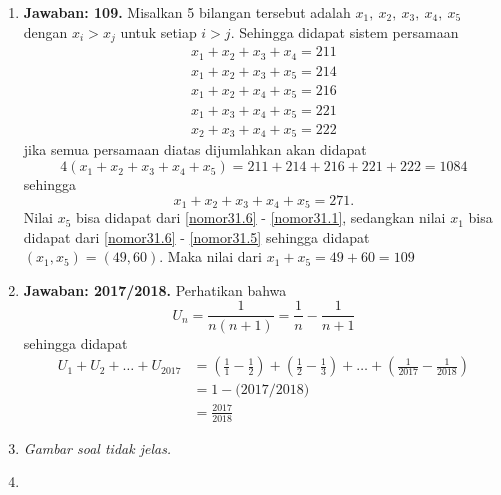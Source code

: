 \begin{enumerate}
\item \textbf{Jawaban: 109.} Misalkan 5 bilangan tersebut adalah $x_1,\ x_2,\ x_3,\ x_4,\ x_5$ dengan $x_i > x_j$ untuk setiap $i>j$. Sehingga didapat sistem persamaan
	\begin{gather}
	x_1 + x_2 + x_3 + x_4 = 211\label{nomor31.1}\\
	x_1 + x_2 + x_3 + x_5 = 214\label{nomor31.2}\\
	x_1 + x_2 + x_4 + x_5 = 216\label{nomor31.3}\\
	x_1 + x_3 + x_4 + x_5 = 221\label{nomor31.4}\\
	x_2 + x_3 + x_4 + x_5 = 222\label{nomor31.5}
	\end{gather}
jika semua persamaan diatas dijumlahkan akan didapat \[4(x_1 + x_2 + x_3 + x_4 + x_5) = 211 + 214 + 216 + 221 + 222 = 1084\]sehingga \begin{equation}\label{nomor31.6}x_1+x_2+x_3+x_4+x_5 = 271.\end{equation} Nilai $x_5$ bisa didapat dari \eqref{nomor31.6} - \eqref{nomor31.1}, sedangkan nilai $x_1$ bisa didapat dari \eqref{nomor31.6} - \eqref{nomor31.5} sehingga didapat $(x_1, x_5) = (49, 60)$. Maka nilai dari $x_1 + x_5 = 49 + 60 = 109$

\item \textbf{Jawaban: 2017/2018.} Perhatikan bahwa \[U_n = \frac{1}{n(n+1)} = \frac{1}{n} - \frac{1}{n+1}\]sehingga didapat
\begin{align*}
U_1 +U_2 +\ldots +U_{2017} &= \left(\frac{1}{1} - \frac{1}{2}\right) + \left(\frac{1}{2} - \frac{1}{3}\right) + \ldots + \left(\frac{1}{2017}-\frac{1}{2018}\right)\\
				      &= 1-\bigl(2017/2018\bigr)\\
				      &= \frac{2017}{2018}
\end{align*}

\item \emph{Gambar soal tidak jelas.}

\item


\end{enumerate}
